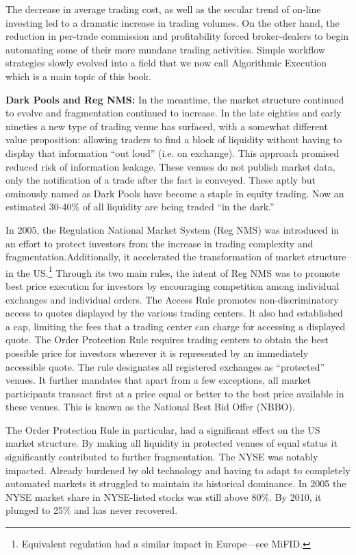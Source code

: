 The decrease in average trading cost, as well as the secular trend of on-line investing led to a dramatic increase in trading volumes. On the other hand, the reduction in per-trade commission and profitability forced broker-dealers to begin automating some of their more mundane trading activities. Simple workflow strategies slowly evolved into a field that we now call Algorithmic Execution which is a main topic of this book. \twomedskip


\noindent\textbf{Dark Pools and Reg NMS:} In the meantime, the market structure continued to evolve and fragmentation continued to increase. In the late eighties and early nineties a new type of trading venue has surfaced, with a somewhat different value proposition: allowing traders to find a block of liquidity without having to display that information ``out loud'' (i.e. on exchange). This approach promised reduced risk of information leakage. These venues do not publish market data, only the notification of a trade after the fact is conveyed.  These aptly but ominously named as Dark Pools have become a staple in equity trading. Now an estimated 30-40\% of all liquidity are being traded ``in the dark.'' \twomedskip


In 2005, the Regulation National Market System (Reg NMS) was introduced in an effort to protect investors from the increase in trading complexity and fragmentation.Additionally, it accelerated the transformation of market structure in the US.\footnote{Equivalent regulation had a similar impact in Europe---see MiFID.} Through its two main rules, the intent of Reg NMS was to promote best price execution for investors by encouraging competition among individual exchanges and individual orders. The Access Rule promotes non-discriminatory access to quotes displayed by the various trading centers. It also had established a cap, limiting the fees that a trading center can charge for accessing a displayed quote. The Order Protection Rule requires trading centers to obtain the best possible price for investors wherever it is represented by an immediately accessible quote. The rule designates all registered exchanges as ``protected'' venues. It further mandates that apart from a few exceptions, all market participants transact first at a price equal or better to the best price available in these venues. This is known as the National Best Bid Offer (NBBO). 


The Order Protection Rule in particular, had a significant effect on the US market structure. By making all liquidity in protected venues of equal status it significantly contributed to further fragmentation. The NYSE was notably impacted. Already burdened by old technology and having to adapt to completely automated markets it struggled to maintain its historical dominance. In 2005 the NYSE market share in NYSE-listed stocks was  still above 80\%. By 2010, it plunged to 25\% and has never recovered.


